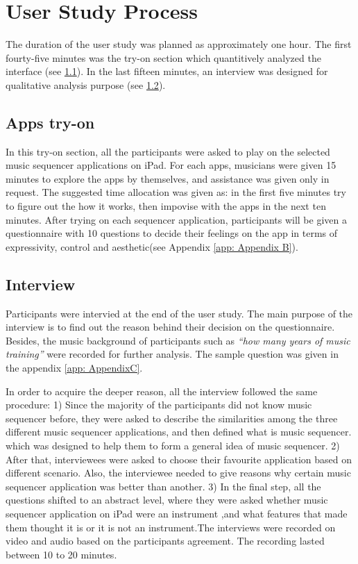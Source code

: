 \section{User Study Process}

The duration of the user study was planned as approximately one hour. The first fourty-five minutes was the try-on section which quantitively analyzed the interface (see \ref{subsec: play on}). In the last fifteen minutes, an interview was designed for qualitative analysis purpose (see \ref{subsec: interview}).

\subsection{Apps try-on}
\label{subsec: play on}
In this try-on section, all the participants were asked to play on the selected music sequencer applications on iPad. For each apps, musicians were given 15 minutes to explore the apps by themselves, and assistance was given only in request. The suggested time allocation was given as: in the first five minutes try to figure out the how it works, then impovise with the apps in the next ten minutes. After trying on each sequencer application, participants will be given a questionnaire with 10 questions to decide their feelings on the app in terms of expressivity, control and aesthetic(see Appendix \ref{app: Appendix B}).


\subsection{Interview}
\label{subsec: interview}
Participants were intervied at the end of the user study. The main purpose of the interview is to find out the reason behind their decision on the questionnaire. Besides, the music background of participants such as \textit{\textquotedblleft{how many years of music training}\textquotedblright} were recorded for further analysis. The sample question was given in the appendix \ref{app: AppendixC}.

In order to acquire the deeper reason, all the interview followed the same procedure: 1) Since the majority of the participants did not know music sequencer before, they were asked to describe the similarities among the three different music sequencer applications, and then defined what is music sequencer. which was designed to help them to form a general idea of music sequencer. 2) After that, interviewees were asked to choose their favourite application based on different scenario. Also, the interviewee needed to give reasons why certain music sequencer application was better than another. 3) In the final step, all the questions shifted to an abstract level, where they were asked whether music sequencer application on iPad were an instrument ,and what features that made them thought it is or it is not an instrument.The interviews were recorded on video and audio based on the participants agreement. The recording lasted between 10 to 20 minutes.

